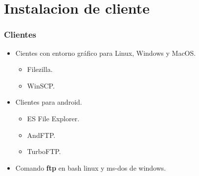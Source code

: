 \section{Instalacion de cliente}
  \begin{frame}
    \frametitle{Clientes}
    \begin{itemize}
    	\item Cientes con entorno gr\'afico para Linux, Windows y MacOS.
		\begin{itemize}
	   	 \item Filezilla.
	   	 \item WinSCP.
	    \end{itemize}

	    \item Clientes para android.
		\begin{itemize}
	   	 \item ES File Explorer.
	   	 \item AndFTP.
	   	 \item TurboFTP. 
	    \end{itemize}

	   	\item Comando {\bf ftp} en bash linux y ms-dos de windows.
	  \end{itemize}
  \end{frame}